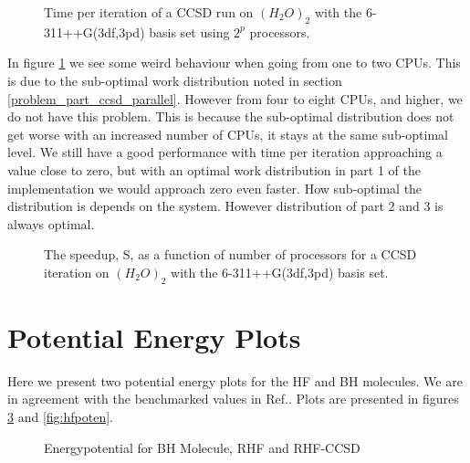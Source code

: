 \begin{figure}[h!]
\begin{center}
\caption{Time per iteration of a CCSD run on $(H_2O)_2$ with the 6-311++G(3df,3pd) basis set using $2^p$ processors.}
\label{fig:ccsd_2h2o_time_per_iter}
\end{center}
\end{figure}

In figure \ref{fig:ccsd_2h2o_time_per_iter} we see some weird
behaviour when going from one to two CPUs. This is due to the
sub-optimal work distribution noted in section
\ref{problem_part_ccsd_parallel}. However from four to eight CPUs, and
higher, we do not have this problem. This is because the sub-optimal
distribution does not get worse with an increased number of CPUs, it
stays at the same sub-optimal level. We still have a good performance
with time per iteration approaching a value close to zero, but with an
optimal work distribution in part 1 of the implementation we would
approach zero even faster. How sub-optimal the distribution is depends
on the system. However distribution of part 2 and 3 is always optimal.

\newpage


\begin{figure}[h!]
\begin{center}
\caption{The speedup, S, as a function of number of processors for a CCSD iteration on $(H_2O)_2$ with the 6-311++G(3df,3pd) basis set.}
\label{fig:ccsd_2h2o_time_speedup}
\end{center}
\end{figure}

\newpage

\section{Potential Energy Plots}
Here we present two potential energy plots for the HF and BH
molecules. We are in agreement with the benchmarked values in
Ref.\cite{potential_energy_citation_plots}. Plots are presented in
figures \ref{fig:bhpoten} and \ref{fig:hfpoten}. \\

\begin{figure}[h!]
\begin{center}
\caption{Energypotential for BH Molecule, RHF and RHF-CCSD}
\label{fig:bhpoten}
\end{center}
\end{figure}

